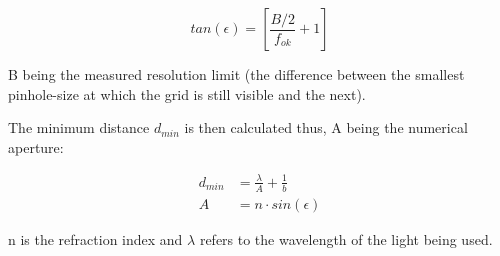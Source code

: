 \label{7}
\begin{equation}
  tan(\epsilon) = [\frac{B/2}{f_{ok}} + 1]\tag{7}
  \end{equation}

B being the measured resolution limit (the difference between the smallest pinhole-size at which the grid is still visible and 
the next). 

The minimum distance $d_{min}$ is then calculated thus, A being the numerical aperture:

\label{8}
\begin{align*}
  d_{min} &= \frac{\lambda}{A} + \frac{1}{b} \tag{8} \\
  A &= n \cdot sin(\epsilon) \tag{8.1} 
\end{align*}

n is the refraction index and $\lambda$ refers to the wavelength of the light being used.

\newpage
